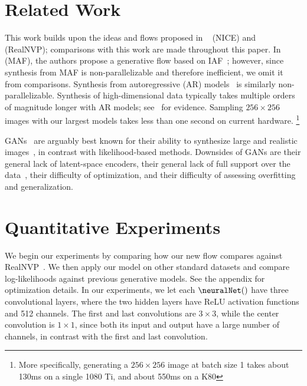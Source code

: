 \documentclass{article}
\begin{document}
\section{Related Work}
\label{sec:relatedwork}

This work builds upon the ideas and flows proposed in ~\citep{dinh2014nice} (NICE) and ~\citep{dinh2016density} (RealNVP); comparisons with this work are made throughout this paper. In~\citep{papamakarios2017masked} (MAF), the authors propose a generative flow based on IAF~\citep{kingma2016improving}; however, since synthesis from MAF is non-parallelizable and therefore inefficient, we omit it from comparisons. Synthesis from autoregressive (AR) models~\citep{hochreiter1997long,graves2013generating,pixelrnn,oord2016conditional,van2016wavenet} is similarly non-parallelizable. Synthesis of high-dimensional data typically takes multiple orders of magnitude longer with AR models; see~\citep{kingma2016improving,oord2017parallel} for evidence. Sampling $256 \times 256$ images with our largest models takes less than one second on current hardware. \footnote{More specifically, generating a $256 \times 256$ image at batch size 1 takes about 130ms on a single 1080 Ti, and about 550ms on a K80}

GANs~\citep{goodfellow2014generative} are arguably best known for their ability to synthesize large and realistic images~\citep{karras2017progressive}, in contrast with likelihood-based methods. Downsides of GANs are their general lack of latent-space encoders, their general lack of full support over the data~\citep{grover2018flow}, their difficulty of optimization, and their difficulty of assessing overfitting and generalization.


\section{Quantitative Experiments}\label{sec:experiments}

We begin our experiments by comparing how our new flow compares against RealNVP~\citep{dinh2016density}. We then apply our model on other standard datasets and compare log-likelihoods against previous generative models. See the appendix for optimization details. In our experiments, we let each $\neuralNet()$ have three convolutional layers, where the two hidden layers have ReLU activation functions and 512 channels. The first and last convolutions are $3 \times 3$, while the center convolution is $1 \times 1$, since both its input and output have a large number of channels, in contrast with the first and last convolution.
\end{document}
